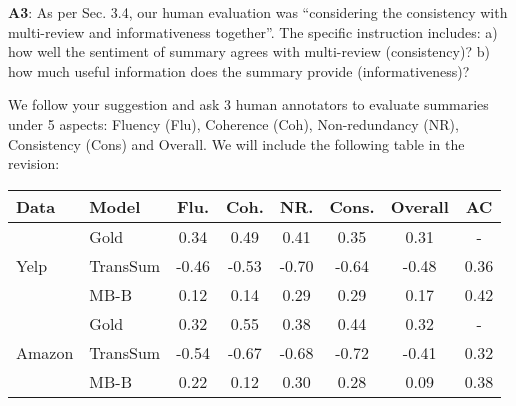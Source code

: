 \documentclass[letterpaper]{article} %
\newcommand{\tabref}[1]{Table \ref{#1}}
\newcommand{\cut}[1]{}
\begin{document}
\noindent 
\textbf{A3}: %
As per Sec. 3.4, our human evaluation was ``considering the consistency with multi-review and informativeness together''.
The specific instruction includes:
a) how well the sentiment of summary agrees with %
multi-review (consistency)?  b) how much useful information %
does the summary provide (informativeness)?

\cut{
\fbox{
	\parbox{0.9\columnwidth}{
		\small Consistency: how well the sentiment of summary agrees with %
		multi-review?
		Informativeness: how much useful information %
		does the summary provide?
}}
}


We follow your suggestion and ask 3 human annotators to evaluate summaries under 5 aspects:
Fluency (Flu), Coherence (Coh), Non-redundancy (NR), Consistency (Cons) and Overall.
We will include the following table in the revision:

\begin{table}[hp]
	\scriptsize
	\centering
	\begin{tabular}{|l|l|c|c|c|c|c|c|}
		\hline
		\bf Data & \bf Model & Flu. & Coh. & NR. & Cons. & Overall & AC \\
		\hline
		\multirow{3}{*}{Yelp}&Gold& 0.34 & 0.49 & 0.41 & 0.35 & 0.31 & -\\
		&TransSum& -0.46 & -0.53 & -0.70& -0.64& -0.48 & 0.36\\
		&MB-B & 0.12 & 0.14 & 0.29 & 0.29 & 0.17 & 0.42 \\
		\hline
		\multirow{3}{*}{Amazon}&Gold& 0.32 & 0.55 & 0.38& 0.44 & 0.32 & -\\
		&TransSum& -0.54 & -0.67 & -0.68 &-0.72 & -0.41 & 0.32 \\
		&MB-B & 0.22 & 0.12 & 0.30 & 0.28 & 0.09 &  0.38\\
		\hline
	\end{tabular}
	\label{tab:manual}
\end{table}
\end{document}
